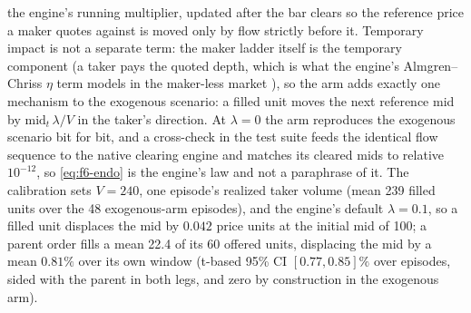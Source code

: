 the engine's running multiplier, updated after the bar clears so the reference price a maker quotes against is moved only by flow strictly before it. Temporary impact is not a separate term: the maker ladder itself is the temporary component (a taker pays the quoted depth, which is what the engine's Almgren--Chriss $\eta$ term models in the maker-less market \citep{almgren2001optimal}), so the arm adds exactly one mechanism to the exogenous scenario: a filled unit moves the next reference mid by $\mathrm{mid}_t\,\lambda/V$ in the taker's direction. At $\lambda = 0$ the arm reproduces the exogenous scenario bit for bit, and a cross-check in the test suite feeds the identical flow sequence to the native clearing engine and matches its cleared mids to relative $10^{-12}$, so \cref{eq:f6-endo} is the engine's law and not a paraphrase of it. The calibration sets $V = 240$, one episode's realized taker volume (mean 239 filled units over the 48 exogenous-arm episodes), and the engine's default $\lambda = 0.1$, so a filled unit displaces the mid by $0.042$ price units at the initial mid of 100; a parent order fills a mean 22.4 of its 60 offered units, displacing the mid by a mean $0.81\%$ over its own window (t-based 95\% CI $[0.77, 0.85]\%$ over episodes, sided with the parent in both legs, and zero by construction in the exogenous arm).


